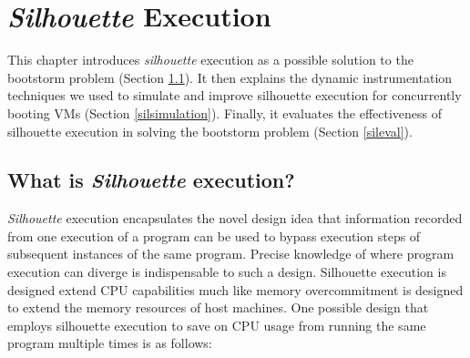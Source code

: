 \chapter{{\em Silhouette} Execution}
This chapter introduces {\em silhouette} 
execution as a possible solution to the bootstorm
problem (Section \ref{def:sil}).
It then explains the dynamic instrumentation 
techniques we used to simulate and improve silhouette execution
for concurrently booting VMs (Section \ref{silsimulation}). Finally,
it evaluates the effectiveness
of silhouette execution in solving the 
bootstorm problem (Section \ref{sileval}). 

\section{What is {\em Silhouette} execution?} \label{def:sil}
{\em Silhouette} execution encapsulates the 
novel design idea that information recorded from one
execution of a program can be used to 
bypass execution steps of subsequent instances
of the same program. Precise knowledge
of where program execution can diverge 
is indispensable to such a design.
Silhouette execution is designed
extend CPU capabilities much like
memory overcommitment is designed to extend
the memory resources of host machines.
One possible design that employs silhouette execution
to save on CPU usage from 
running the same program multiple times is as follows:

